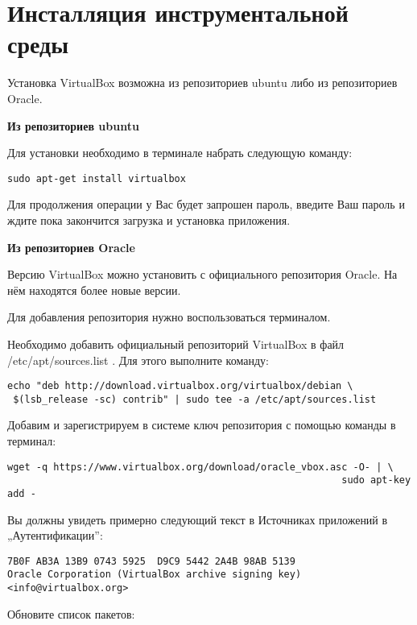 \newpage
\section{Инсталляция инструментальной среды}

Установка VirtualBox возможна из репозиториев ubuntu либо из репозиториев Oracle.

\textbf{Из репозиториев ubuntu}

Для установки необходимо в терминале набрать следующую команду:

\begin{Verbatim}[frame=single]
sudo apt-get install virtualbox
\end{Verbatim}

Для продолжения операции у Вас будет запрошен пароль, введите Ваш пароль и ждите пока закончится загрузка и установка приложения.

\textbf{Из репозиториев Oracle}

Версию VirtualBox можно установить с официального репозитория Oracle. На нём находятся более новые версии.

Для добавления репозитория нужно воспользоваться терминалом.

Необходимо добавить официальный репозиторий VirtualBox в файл /etc/apt/sources.list . Для этого выполните команду:

\begin{Verbatim}[frame=single]
echo "deb http://download.virtualbox.org/virtualbox/debian \
 $(lsb_release -sc) contrib" | sudo tee -a /etc/apt/sources.list
\end{Verbatim}

Добавим и зарегистрируем в системе ключ репозитория с помощью команды в терминал:

\begin{Verbatim}[frame=single]
wget -q https://www.virtualbox.org/download/oracle_vbox.asc -O- | \
                                                          sudo apt-key add -
\end{Verbatim}

Вы должны увидеть примерно следующий текст в Источниках приложений в „Аутентификации”:

\begin{Verbatim}[frame=single]
7B0F AB3A 13B9 0743 5925  D9C9 5442 2A4B 98AB 5139
Oracle Corporation (VirtualBox archive signing key) <info@virtualbox.org>
\end{Verbatim}

Обновите список пакетов:

